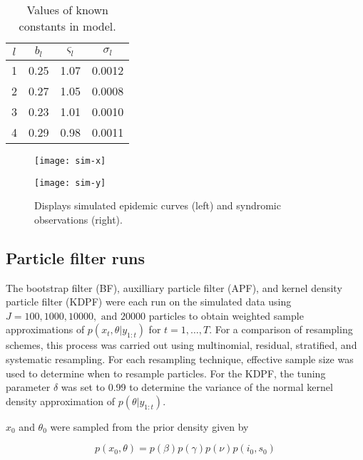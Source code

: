 \documentclass{elsarticle}
\begin{document}
\begin{table}[ht]
\begin{center}
\caption{Values of known constants in model.}
\label{tab:true}
\begin{tabular}{|cccc|}
\hline
$l$ & $b_l$ & $\varsigma_l$ & $\sigma_l$ \\
\hline
1 & 0.25 & 1.07 & 0.0012 \\
2 & 0.27 & 1.05 & 0.0008 \\
3 & 0.23 & 1.01 & 0.0010 \\
4 & 0.29 & 0.98 & 0.0011 \\
\hline
\end{tabular}
\end{center}
\end{table}

\begin{figure}
\centering
\begin{minipage}{0.48\linewidth}
\texttt{[image: sim-x]}
\end{minipage}
\begin{minipage}{0.48\linewidth}
\texttt{[image: sim-y]}
\end{minipage}
\caption{Displays simulated epidemic curves (left) and syndromic observations (right).} \label{fig:data}
\end{figure}

\subsection{Particle filter runs} \label{sec:pf}

The bootstrap filter (BF), auxilliary particle filter (APF), and kernel density particle filter (KDPF) were each run on the simulated data using $J = 100, 1000, 10000, \mbox{ and } 20000$ particles to obtain weighted sample approximations of $p(x_t,\theta|y_{1:t})$ for $t = 1,\ldots,T$.  For a comparison of resampling schemes, this process was carried out using multinomial, residual, stratified, and systematic resampling.  For each resampling technique, effective sample size was used to determine when to resample particles.  For the KDPF, the tuning parameter $\delta$ was set to 0.99 to determine the variance of the normal kernel density approximation of $p(\theta|y_{1:t})$.

$x_0$ and $\theta_0$ were sampled from the prior density given by

\[p\left(x_0,\theta\right) = p\left(\beta\right)p\left(\gamma\right)p\left(\nu\right)p\left(i_0,s_0\right)\]
\end{document}
